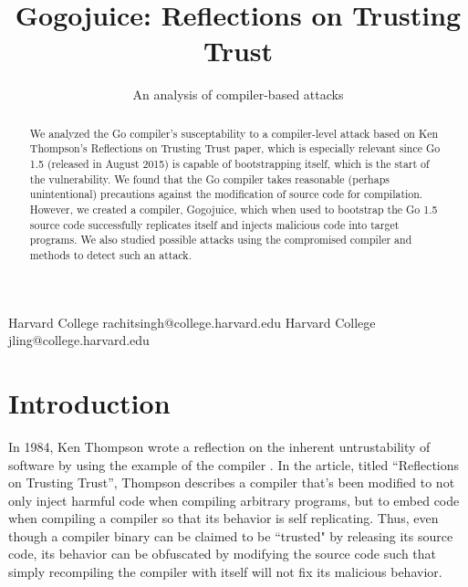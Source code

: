 \documentclass[10pt]{sigplanconf}
\begin{document}



\permissiontopublish             %


\title{Gogojuice: Reflections on Trusting Trust}
\subtitle{An analysis of compiler-based attacks}

           {Harvard College}
           {rachitsingh@college.harvard.edu}
           {Harvard College}
           {jling@college.harvard.edu}

\maketitle

\begin{abstract}
We analyzed the Go compiler's susceptability to a compiler-level attack based on Ken Thompson's Reflections on Trusting Trust paper, which is especially relevant since Go 1.5 (released in August 2015) is capable of bootstrapping itself, which is the start of the vulnerability. We found that the Go compiler takes reasonable (perhaps unintentional) precautions against the modification of source code for compilation. However, we created a compiler, Gogojuice, which when used to bootstrap the Go 1.5 source code successfully replicates itself and injects malicious code into target programs. We also studied possible attacks using the compromised compiler and methods to detect such an attack.
\end{abstract}

\section{Introduction}
In 1984, Ken Thompson wrote a reflection on the inherent untrustability of software by using the example of the compiler \cite{thompson}. In the article, titled ``Reflections on Trusting Trust'', Thompson describes a compiler that's been modified to not only inject harmful code when compiling arbitrary programs, but to embed code when compiling a compiler so that its behavior is self replicating. Thus, even though a compiler binary can be claimed to be ``trusted" by releasing its source code, its behavior can be obfuscated by modifying the source code such that simply recompiling the compiler with itself will not fix its malicious behavior.
\end{document}
